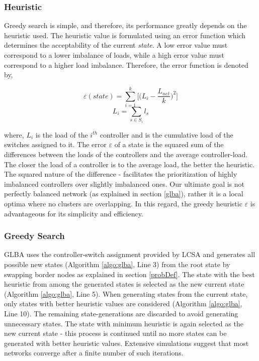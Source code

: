 \documentclass[a4paper,fleqn]{cas-dc}
\begin{document}
\subsubsection{Heuristic}
\noindent Greedy search is simple, and therefore, its performance greatly depends on the heuristic used. The heuristic value is formulated using an error function which determines the acceptability of the current \textit{state}. A low error value must correspond to a lower imbalance of loads, while a high error value must correspond to a higher load imbalance. Therefore, the error function is denoted by,

\begin{equation}
\varepsilon(state) = \sum_{i=1}^{k}\Bigg[\Big(L_i - \frac{L_{net}}{k}\Big)^2\Bigg]
\end{equation}
\begin{equation} \label{eqn:cload}
L_i = \sum_{s\in S_i}l_{s}
\end{equation}

where, $L_i$ is the load of the $i^{th}$ controller and is the cumulative load of the switches assigned to it. The error $\varepsilon$ of a state is the squared sum of the differences between the loads of the controllers and the average controller-load. The closer the load of a controller is to the average load, the better the heuristic. The squared nature of the difference - facilitates the prioritization of highly imbalanced controllers over slightly imbalanced ones. Our ultimate goal is not perfectly balanced network (as explained in section \ref{glba}), rather it is a local optima where no clusters are overlapping. In this regard, the greedy heuristic $\varepsilon$ is advantageous for its simplicity and efficiency.

\subsubsection{Greedy Search}
GLBA uses the controller-switch assignment provided by LCSA and generates all possible new states (Algorithm \ref{algo:glba}, Line 3) from the root state by swapping border nodes as explained in section \ref{probDef}. The state with the best heuristic from among the generated states is selected as the new current state (Algorithm \ref{algo:glba}, Line 5). When generating states from the current state, only states with better heuristic values are considered (Algorithm \ref{algo:glba}, Line 10). The remaining state-generations are discarded to avoid generating unnecessary states. The state with minimum heuristic is again selected as the new current state - this process is continued until no more states can be generated with better heuristic values. Extensive simulations suggest that most networks converge after a finite number of such iterations.
\end{document}
